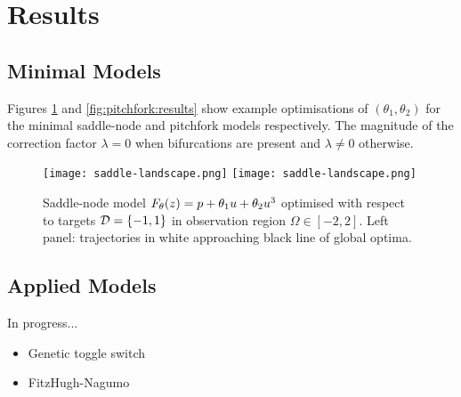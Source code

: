 \section{Results}

\subsection{Minimal Models}
Figures \ref{fig:saddle-node:results} and \ref{fig:pitchfork:results} show example optimisations of $(\theta_1,\theta_2)$ for the minimal saddle-node and pitchfork models respectively. The magnitude of the correction factor $\lambda=0$ when bifurcations are present and $\lambda\neq0$ otherwise.

\begin{figure}[H]
\centering{}
\captionsetup{justification=centering}
\texttt{[image: saddle-landscape.png]}
\texttt{[image: saddle-landscape.png]}
\caption{Saddle-node model $F_{\theta}(z) = p + \theta_{1}u+\theta_{2}u^3$ optimised with respect to targets $\mathcal{D}=\{-1,1\}$ in observation region $\Omega\in[-2,2]$. Left panel: trajectories in white approaching black line of global optima.}
\label{fig:saddle-node:results}
\end{figure}

\subsection{Applied Models}
In progress...
\begin{itemize}
    \item Genetic toggle switch
    \item FitzHugh-Nagumo
\end{itemize}



